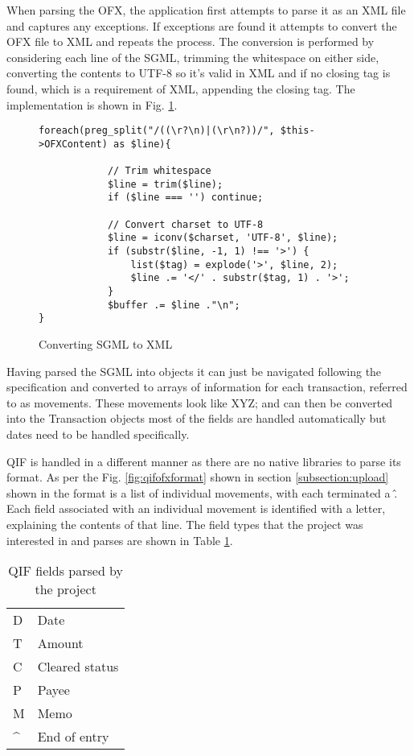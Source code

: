 When parsing the OFX, the application first attempts to parse it as an XML file and captures any exceptions. If exceptions are found it attempts to convert the OFX file to XML and repeats the process.
%
The conversion is performed by considering each line of the SGML, trimming the whitespace on either side, converting the contents to UTF-8 so it's valid in XML and if no closing tag is found, which is a requirement of XML, appending the closing tag.
%
The implementation is shown in Fig. \ref{fig:sgmlxml}.

\begin{figure}
\lstset{style=phpcolor}
\begin{lstlisting}
foreach(preg_split("/((\r?\n)|(\r\n?))/", $this->OFXContent) as $line){
        		
        	// Trim whitespace
        	$line = trim($line);
        	if ($line === '') continue;
        
        	// Convert charset to UTF-8
        	$line = iconv($charset, 'UTF-8', $line);
        	if (substr($line, -1, 1) !== '>') {
        		list($tag) = explode('>', $line, 2);
        		$line .= '</' . substr($tag, 1) . '>';
        	}
        	$buffer .= $line ."\n";
}
\end{lstlisting}
\caption{Converting SGML to XML}
\label{fig:sgmlxml}
\end{figure}

Having parsed the SGML into objects it can just be navigated following the specification and converted to arrays of information for each transaction, referred to as movements. These movements look like XYZ; and can then be converted into the Transaction objects most of the fields are handled automatically but dates need to be handled specifically.

QIF is handled in a different manner as there are no native libraries to parse its format. As per the Fig. \ref{fig:qifofxformat} shown in section \ref{subsection:upload} shown in  the format is a list of individual movements, with each terminated a \^. Each field associated with an individual movement is identified with a letter, explaining the contents of that line.
% 
The field types that the project was interested in and parses are shown in Table \ref{table:qiffields}.

\begin{table}[h]
\centering
\begin{tabular}{ll}
D                  & Date           \\
T                  & Amount         \\
C                  & Cleared status \\
P                  & Payee          \\
M                  & Memo           \\
\textasciicircum   & End of entry  
\end{tabular}
\caption{QIF fields parsed by the project}
\label{table:qiffields}
\end{table}

